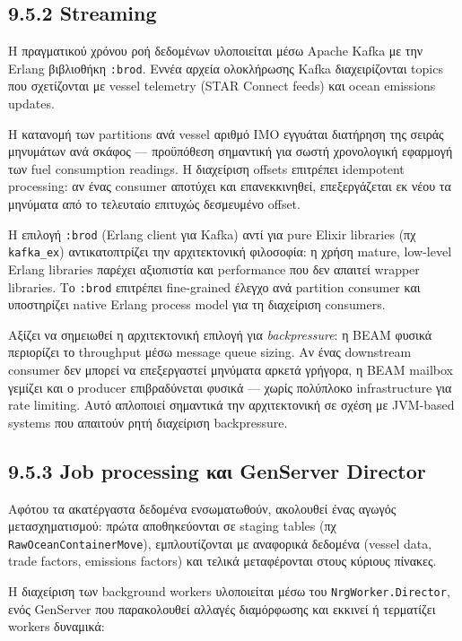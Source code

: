 \subsection{9.5.2 Streaming}\label{streaming}

Η πραγματικού χρόνου ροή δεδομένων υλοποιείται μέσω Apache Kafka με την
Erlang βιβλιοθήκη \texttt{:brod}. Εννέα αρχεία ολοκλήρωσης Kafka
διαχειρίζονται topics που σχετίζονται με vessel telemetry (STAR Connect
feeds) και ocean emissions updates.

Η κατανομή των partitions ανά vessel αριθμό IMO εγγυάται διατήρηση της
σειράς μηνυμάτων ανά σκάφος --- προϋπόθεση σημαντική για σωστή
χρονολογική εφαρμογή των fuel consumption readings. Η διαχείριση offsets
επιτρέπει idempotent processing: αν ένας consumer αποτύχει και
επανεκκινηθεί, επεξεργάζεται εκ νέου τα μηνύματα από το τελευταίο
επιτυχώς δεσμευμένο offset.

Η επιλογή \texttt{:brod} (Erlang client για Kafka) αντί για pure Elixir
libraries (πχ \texttt{kafka\_ex}) αντικατοπτρίζει την αρχιτεκτονική
φιλοσοφία: η χρήση mature, low-level Erlang libraries παρέχει αξιοπιστία
και performance που δεν απαιτεί wrapper libraries. Το \texttt{:brod}
επιτρέπει fine-grained έλεγχο ανά partition consumer και υποστηρίζει
native Erlang process model για τη διαχείριση consumers.

Αξίζει να σημειωθεί η αρχιτεκτονική επιλογή για \emph{backpressure}: η
BEAM φυσικά περιορίζει το throughput μέσω message queue sizing. Αν ένας
downstream consumer δεν μπορεί να επεξεργαστεί μηνύματα αρκετά γρήγορα,
η BEAM mailbox γεμίζει και ο producer επιβραδύνεται φυσικά --- χωρίς
πολύπλοκο infrastructure για rate limiting. Αυτό απλοποιεί σημαντικά την
αρχιτεκτονική σε σχέση με JVM-based systems που απαιτούν ρητή διαχείριση
backpressure.

\subsection{9.5.3 Job processing και GenServer
Director}\label{job-processing-ux3baux3b1ux3b9-genserver-director}

Αφότου τα ακατέργαστα δεδομένα ενσωματωθούν, ακολουθεί ένας αγωγός
μετασχηματισμού: πρώτα αποθηκεύονται σε staging tables (πχ
\texttt{RawOceanContainerMove}), εμπλουτίζονται με αναφορικά δεδομένα
(vessel data, trade factors, emissions factors) και τελικά μεταφέρονται
στους κύριους πίνακες.

Η διαχείριση των background workers υλοποιείται μέσω του
\texttt{NrgWorker.Director}, ενός GenServer που παρακολουθεί αλλαγές
διαμόρφωσης και εκκινεί ή τερματίζει workers δυναμικά:

